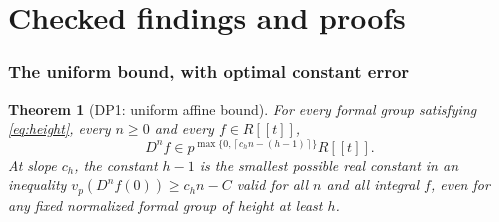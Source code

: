\documentclass[11pt,a4paper]{article}
\newtheorem{theorem}{Theorem}[section]
\theoremstyle{definition}\newtheorem{remark}[theorem]{Remark}
\newcommand{\vp}{v_p}\newcommand{\dR}{\mathrm{dR}}\newcommand{\crys}{\mathrm{crys}}
\newcommand{\ceil}[1]{\left\lceil #1\right\rceil}\newcommand{\floor}[1]{\left\lfloor #1\right\rfloor}
\begin{document}
\part{Checked findings and proofs}

\section{The uniform bound, with optimal constant error}

\begin{theorem}[DP1: uniform affine bound]\label{DP1}
For every formal group satisfying \eqref{eq:height}, every $n\ge0$ and every $f\in R[[t]]$,
\begin{equation}\label{eq:affine}
 D^n f\in p^{\max\{0,\ceil{c_hn-(h-1)}\}}R[[t]].
\end{equation}
At slope $c_h$, the constant $h-1$ is the smallest possible real constant in an inequality $\vp(D^nf(0))\ge c_hn-C$ valid for all $n$ and all integral $f$, even for any fixed normalized formal group of height at least $h$.
\end{theorem}
\end{document}

